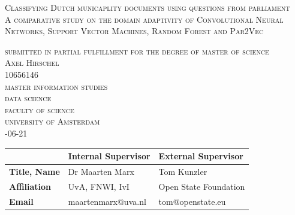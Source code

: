 \begin{titlepage}


\begin{center}
\textsc{\Large Classifying Dutch municaplity documents using questions from parliament}\\
\textsc{A comparative study on the domain adaptivity of Convolutional Neural Networks, Support Vector Machines, Random Forest and Par2Vec  }

\bigskip

\textsc{\large
submitted in partial fulfillment for the degree of master of science\\
%
\bigskip
Axel Hirschel\\
%
10656146\\
%
\bigskip
master information studies\\
%
data science \\
%
faculty of science\\
%
university of Amsterdam\\
%
-06-21
}

\end{center}
 

\vfill

\begin{center}
\begin{tabular}{|l||ll|}
\hline
 & \textbf{Internal  Supervisor} & \textbf{External   Supervisor}  \\   
 \hline
\textbf{Title, Name} & Dr Maarten Marx& Tom Kunzler  \\
\textbf{Affiliation} &UvA, FNWI, IvI & Open State Foundation \\ 
\textbf{Email} & maartenmarx@uva.nl&tom@openstate.eu \\
\hline
\end{tabular}
\end{center}


\bigskip


\end{titlepage}
